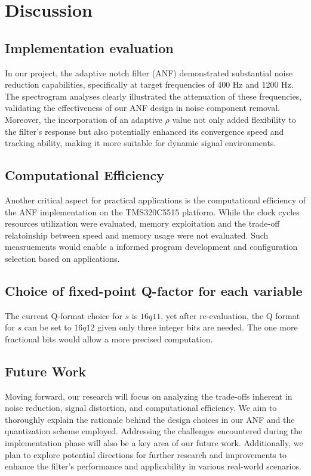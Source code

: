 \section{Discussion}
\subsection{Implementation evaluation}
In our project, the adaptive notch filter (ANF) demonstrated substantial noise reduction capabilities, specifically at target frequencies of 400 Hz and 1200 Hz. The spectrogram analyses clearly illustrated the attenuation of these frequencies, validating the effectiveness of our ANF design in noise component removal. Moreover, the incorporation of an adaptive $\rho$ value not only added flexibility to the filter's response but also potentially enhanced its convergence speed and tracking ability, making it more suitable for dynamic signal environments.

\subsection{Computational Efficiency}
Another critical aspect for practical applications is the computational efficiency of the ANF implementation on the TMS320C5515 platform. While the clock cycles resources utilization were evaluated, memory exploitation and the trade-off relatoinship between speed and memory usage were not evaluated. Such measruements would enable a informed program development and configuration selection based on applications. 

\subsection{Choice of fixed-point Q-factor for each variable}
The current Q-format choice for $s$ is $16q11$, yet after re-evaluation, the Q format for $s$ can be set to $16q12$ given only three integer bits are needed. The one more fractional bits would allow a more precised computation.

\subsection{Future Work}
Moving forward, our research will focus on analyzing the trade-offs inherent in noise reduction, signal distortion, and computational efficiency. We aim to thoroughly explain the rationale behind the design choices in our ANF and the quantization scheme employed. Addressing the challenges encountered during the implementation phase will also be a key area of our future work. Additionally, we plan to explore potential directions for further research and improvements to enhance the filter's performance and applicability in various real-world scenarios.

